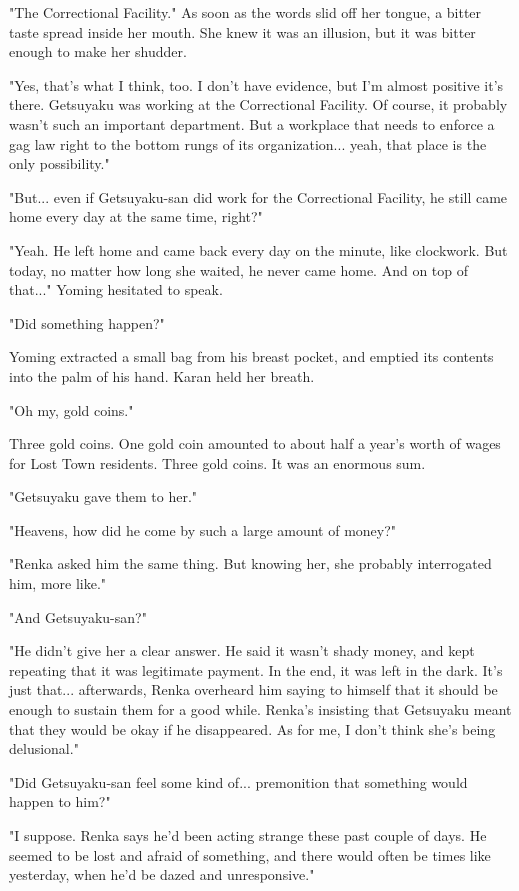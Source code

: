 "The Correctional Facility." As soon as the words slid off her tongue, a
bitter taste spread inside her mouth. She knew it was an illusion, but
it was bitter enough to make her shudder.

"Yes, that's what I think, too. I don't have evidence, but I'm almost
positive it's there. Getsuyaku was working at the Correctional Facility.
Of course, it probably wasn't such an important department. But a
workplace that needs to enforce a gag law right to the bottom rungs of
its organization... yeah, that place is the only possibility."

"But... even if Getsuyaku-san did work for the Correctional Facility, he
still came home every day at the same time, right?"

"Yeah. He left home and came back every day on the minute, like
clockwork. But today, no matter how long she waited, he never came home.
And on top of that..." Yoming hesitated to speak.

"Did something happen?"

Yoming extracted a small bag from his breast pocket, and emptied its
contents into the palm of his hand. Karan held her breath.

"Oh my, gold coins."

Three gold coins. One gold coin amounted to about half a year's worth of
wages for Lost Town residents. Three gold coins. It was an enormous sum.

"Getsuyaku gave them to her."

"Heavens, how did he come by such a large amount of money?"

"Renka asked him the same thing. But knowing her, she probably
interrogated him, more like."

"And Getsuyaku-san?"

"He didn't give her a clear answer. He said it wasn't shady money, and
kept repeating that it was legitimate payment. In the end, it was left
in the dark. It's just that... afterwards, Renka overheard him saying to
himself that it should be enough to sustain them for a good while.
Renka's insisting that Getsuyaku meant that they would be okay if he
disappeared. As for me, I don't think she's being delusional."

"Did Getsuyaku-san feel some kind of... premonition that something would
happen to him?"

"I suppose. Renka says he'd been acting strange these past couple of
days. He seemed to be lost and afraid of something, and there would
often be times like yesterday, when he'd be dazed and unresponsive."

